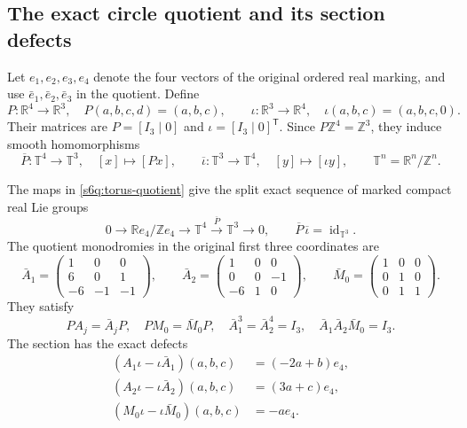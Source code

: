 \subsection{The exact circle quotient and its section defects}

Let $e_1,e_2,e_3,e_4$ denote the four vectors of the original ordered
real marking, and use $\bar e_1,\bar e_2,\bar e_3$ in the quotient.
Define
\[
 P:\mathbb R^4\longrightarrow\mathbb R^3,
 \quad P(a,b,c,d)=(a,b,c),\qquad
 \iota:\mathbb R^3\longrightarrow\mathbb R^4,
 \quad\iota(a,b,c)=(a,b,c,0).
\]
Their matrices are $P=[I_3\mid0]$ and
$\iota=[I_3\mid0]^{\mathsf T}$. Since $P\mathbb Z^4=\mathbb Z^3$,
they induce smooth homomorphisms
\begin{equation}
 \overline P:\mathbb T^4\longrightarrow\mathbb T^3,
 \quad[x]\longmapsto[Px],\qquad
 \overline\iota:\mathbb T^3\longrightarrow\mathbb T^4,
 \quad[y]\longmapsto[\iota y],
 \qquad \mathbb T^n=\mathbb R^n/\mathbb Z^n.
 \label{s6q:torus-quotient}
\end{equation}

\begin{proposition}
The maps in \eqref{s6q:torus-quotient} give the split exact sequence of
marked compact real Lie groups
\begin{equation}
 0\longrightarrow\mathbb Re_4/\mathbb Ze_4
   \longrightarrow\mathbb T^4
   \xrightarrow{\ \overline P\ }\mathbb T^3\longrightarrow0,
 \qquad \overline P\,\overline\iota=\operatorname{id}_{\mathbb T^3}.
 \label{s6q:exact-sequence}
\end{equation}
The quotient monodromies in the original first three coordinates are
\begin{equation}
 \bar A_1=\begin{pmatrix}1&0&0\\6&0&1\\-6&-1&-1\end{pmatrix},\qquad
 \bar A_2=\begin{pmatrix}1&0&0\\0&0&-1\\-6&1&0\end{pmatrix},\qquad
 \bar M_0=\begin{pmatrix}1&0&0\\0&1&0\\0&1&1\end{pmatrix}.
 \label{s6q:quotient-matrices}
\end{equation}
They satisfy
\[
 PA_j=\bar A_jP,\quad PM_0=\bar M_0P,\quad
 \bar A_1^3=\bar A_2^4=I_3,\quad \bar A_1\bar A_2\bar M_0=I_3.
\]
The section has the exact defects
\begin{equation}
 \begin{aligned}
 (A_1\iota-\iota\bar A_1)(a,b,c)&=(-2a+b)e_4,\\
 (A_2\iota-\iota\bar A_2)(a,b,c)&=(3a+c)e_4,\\
 (M_0\iota-\iota\bar M_0)(a,b,c)&=-ae_4.
 \end{aligned}
 \label{s6q:section-defects}
\end{equation}
\end{proposition}


